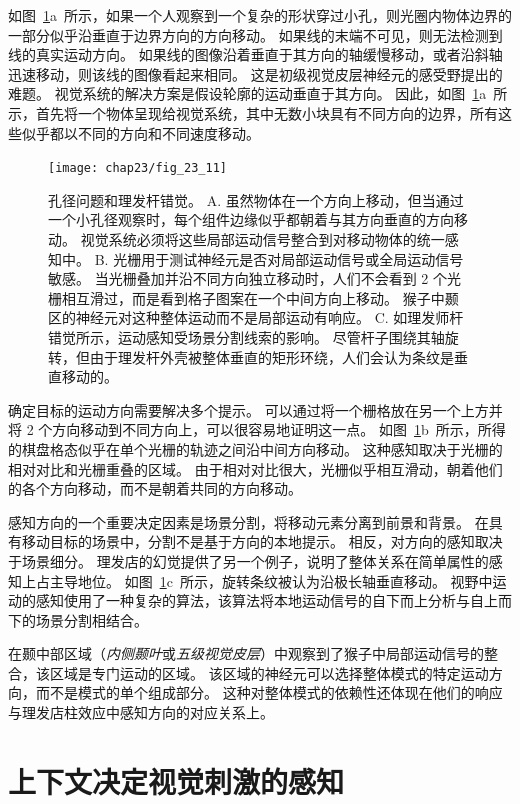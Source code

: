 如图~\ref{fig:23_11}a~所示，如果一个人观察到一个复杂的形状穿过小孔，则光圈内物体边界的一部分似乎沿垂直于边界方向的方向移动。
如果线的末端不可见，则无法检测到线的真实运动方向。 
如果线的图像沿着垂直于其方向的轴缓慢移动，或者沿斜轴迅速移动，则该线的图像看起来相同。
这是初级视觉皮层神经元的感受野提出的难题。 
视觉系统的解决方案是假设轮廓的运动垂直于其方向。 
因此，如图~\ref{fig:23_11}a~所示，首先将一个物体呈现给视觉系统，其中无数小块具有不同方向的边界，所有这些似乎都以不同的方向和不同速度移动。


\begin{figure}[htbp]
	\centering
	\texttt{[image: chap23/fig\_23\_11]}
	\caption{孔径问题和理发杆错觉。
		A. 虽然物体在一个方向上移动，但当通过一个小孔径观察时，每个组件边缘似乎都朝着与其方向垂直的方向移动。
		视觉系统必须将这些局部运动信号整合到对移动物体的统一感知中。
		B. 光栅用于测试神经元是否对局部运动信号或全局运动信号敏感。
		当光栅叠加并沿不同方向独立移动时，人们不会看到 2 个光栅相互滑过，而是看到格子图案在一个中间方向上移动。
		猴子中颞区的神经元对这种整体运动而不是局部运动有响应。
		C. 如理发师杆错觉所示，运动感知受场景分割线索的影响。
		尽管杆子围绕其轴旋转，但由于理发杆外壳被整体垂直的矩形环绕，人们会认为条纹是垂直移动的。}
	\label{fig:23_11}
\end{figure}


确定目标的运动方向需要解决多个提示。
可以通过将一个栅格放在另一个上方并将 2 个方向移动到不同方向上，可以很容易地证明这一点。
如图~\ref{fig:23_11}b~所示，所得的棋盘格态似乎在单个光栅的轨迹之间沿中间方向移动。
这种感知取决于光栅的相对对比和光栅重叠的区域。
由于相对对比很大，光栅似乎相互滑动，朝着他们的各个方向移动，而不是朝着共同的方向移动。


感知方向的一个重要决定因素是场景分割，将移动元素分离到前景和背景。
在具有移动目标的场景中，分割不是基于方向的本地提示。
相反，对方向的感知取决于场景细分。
理发店的幻觉提供了另一个例子，说明了整体关系在简单属性的感知上占主导地位。
如图~\ref{fig:23_11}c~所示，旋转条纹被认为沿极长轴垂直移动。
视野中运动的感知使用了一种复杂的算法，该算法将本地运动信号的自下而上分析与自上而下的场景分割相结合。


在颞中部区域（\textit{内侧颞叶}或\textit{五级视觉皮层}）中观察到了猴子中局部运动信号的整合，该区域是专门运动的区域。
该区域的神经元可以选择整体模式的特定运动方向，而不是模式的单个组成部分。
这种对整体模式的依赖性还体现在他们的响应与理发店柱效应中感知方向的对应关系上。



\section{上下文决定视觉刺激的感知}

